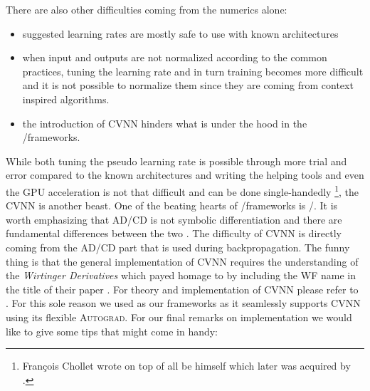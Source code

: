 There are also other difficulties coming from the numerics alone:
\begin{itemize}
	\item suggested learning rates are mostly safe to use with known architectures
	\item when input and outputs are not normalized according to the common practices, tuning the learning rate and in turn training becomes more difficult and it is not possible to normalize them since they are coming from context inspired algorithms.
	\item the introduction of \ac{CVNN}\cite{CTOBYZDSSSJFSSMNRYBCP2017}\cite{Bassey2021}\cite{Barrachina2023} hinders what is under the hood in the \ml/\dl frameworks.
\end{itemize}

While both tuning the pseudo learning rate is possible through more trial and error compared to the known architectures and 
writing the helping tools and even the \ac{GPU} acceleration is not that difficult and can be done single-handedly
\footnote{Fran\c{c}ois Chollet wrote \keras\cite{Chollet2023} on top of \tensorflow\cite{Abadi2016} all be himself which later was acquired by \google.}, the \ac{CVNN} is another beast. 
One of the beating hearts of \ml/\dl frameworks is \ad/\cd. It is worth emphasizing that \ac{AD}/\ac{CD} is not symbolic differentiation and there are fundamental differences between the two \cite{Naumann2011}\cite{Griewank2008}. 
The difficulty of \ac{CVNN}\cite{CTOBYZDSSSJFSSMNRYBCP2017}\cite{Bassey2021}\cite{Barrachina2023} is directly coming from the \ac{AD}/\ac{CD} part 
that is used during backpropagation. The funny thing is that the general implementation of \ac{CVNN} requires the understanding of the 
\emph{Wirtinger Derivatives}\cite{Wirtinger1927} which \cite{Candes2014} payed homage to by including the \ac{WF} name in the title of their paper \cite{Candes2014}. 
For theory and implementation of \ac{CVNN} please refer to \cite{Wirtinger1927}\cite{KreutzDelgado2009}. For this sole reason 
we used \pytorch\cite{Paszke2019} as our frameworks as it seamlessly supports \ac{CVNN} using its flexible \textsc{Autograd}\cite{Paszke2019}. For our final remarks 
on implementation we would like to give some tips that might come in handy:
